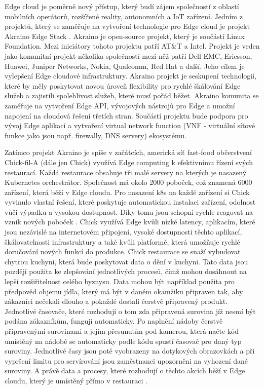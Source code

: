      Edge cloud je poměrně nový přístup, který budí zájem společností z oblastí mobilních operátorů, rozšířené reality, autonomních a IoT zařízení. Jedním z projektů, který se zaměřuje na vytvoření technologie pro Edge cloud je projekt Akraino Edge Stack \cite{akraino}. Akraino je open-source projekt, který je součástí Linux Foundation. Mezi iniciátory tohoto projektu patří AT&T a Intel. Projekt je veden jako komunitní projekt několika společností mezi něž patří Dell EMC, Ericsson, Huawei, Juniper Networks, Nokia, Qualcomm, Red Hat a další. Jeho cílem je vylepšení Edge cloudové infrastruktury. Akraino projekt je seskupení technologií, které by měly poskytovat novou úroveň \linebreak flexibility pro rychlé škálování Edge služeb a zajistili spolehlivost služeb, které musí pořád běžet. Akraino komunita se zaměřuje na vytvoření Edge API, vývojových \linebreak nástrojů pro Edge a umožní napojení na cloudová řešení třetích stran. Součástí projektu bude podpora pro vývoj Edge aplikací a vytvoření virtual network function (VNF - virtuální sítové funkce jako jsou např. firewally, DNS servery) ekosystému. \par
         Zatímco projekt Akraino je spíše v začátcích, americká síť fast-food občerstvení Chick-fil-A (dále jen Chick) využívá Edge computing k efektivnímu řízení svých restaurací. Každá restaurace obsahuje tři malé servery na kterých je nasazený Kubernetes orchestrátor. Společnost má okolo 2000 poboček, což znamená 6000 zařízení, která běží v Edge cloudu. Pro nasazení k8s na každé zařízení si Chick vyvinulo vlastní řešení, které poskytuje automatickou instalaci zařízení, odolnost vůči výpadku a vysokou dostupnost. Díky tomu jsou schopni rychle reagovat na vznik nových poboček \cite{chick-1}. Chick využívá Edge kvůli nízké latency, aplikacím, které jsou nezávislé na internetovém připojení, vysoké dostupnosti těchto aplikací, škálovatelnosti infrastruktury a také kvůli platformě, která umožňuje rychlé doručování nových funkcí do produkce. Chick restaurace se snaží vybudovat chytrou kuchyni, která bude poskytovat data o dění v kuchyni. Tato data jsou později použita ke zlepšování jednotlivých procesů, čímž mohou dosáhnout na lepší rozšiřitelnost celého byznysu. Data mohou být například použita pro předpověd objemu jídla, který má být v daném okamžiku připraven tak, aby zákazníci nečekali dlouho a pokaždé dostali čerstvě připravený produkt. Jednotlivé časovače, které rozhodují o tom zda připravená surovina jíž nesmí být podána zákazníkům, fungují automaticky. Po naplnění nádoby čerstvě připravenými surovinami a jejím přesunutím pod kamerou, která načte kód umístěný na nádobě se automaticky podle kódu spustí časovač pro daný typ suroviny. Jednotlivé časy jsou poté vyobrazeny \linebreak na dotykových obrazovkách a při vypršení limitu pro servírování jsou zaměstnanci \linebreak upozorněni na vyhození dané suroviny. A právě data a procesy, které rozhodují o těchto akcích běží v Edge cloudu, který je umístěný přímo v restauraci \cite{chick-3}.
